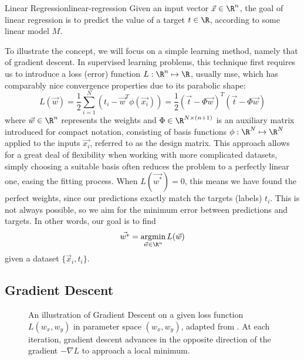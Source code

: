 \begin{definition}{Linear Regression}{linear-regression}
  Given an input vector $\vec{x} \in \R^n$, the goal of linear regression is to predict the value of a target $t \in \R$, according to some linear model $M$.
\end{definition}

To illustrate the concept, we will focus on a simple learning method, namely that of gradient descent.
In supervised learning problems, this technique first requires us to introduce a loss (error) function $L: \R^n \mapsto \R$, usually \gls{mse}, which has comparably nice convergence properties due to its parabolic shape:
$$L(\vec{w}) = \frac{1}{2} \sum_{i=1}^N (t_i - \vec{w}^T \phi(\vec{x_i})) = \frac{1}{2} (\vec{t} - \Phi \vec{w})^T (\vec{t} - \Phi \vec{w})$$
where $\vec{w} \in \R^n$ represents the weights and $\Phi \in \R^{N \times (n+1)}$ is an auxiliary matrix introduced for compact notation, consisting of basis functions $\phi: \R^N \mapsto \R^N$ applied to the inputs $\vec{x_i}$, referred to as the design matrix.
This approach allows for a great deal of flexibility when working with more complicated datasets, simply choosing a suitable basis often reduces the problem to a perfectly linear one, easing the fitting process.
When $L(\vec{w^*}) = 0$, this means we have found the perfect weights, since our predictions exactly match the targets (labels) $t_i$.
This is not always possible, so we aim for the minimum error between predictions and targets.
In other words, our goal is to find
$$\vec{w^*} = \underset{\vec{w} \in \R^n}{\text{argmin}}\, L(\vec{w})$$
given a dataset $\{\vec{x}_i, t_i\}$.

\subsection{Gradient Descent}
\begin{figure}[H]
  \centering
  \caption[Illustration of Gradient Descent]{
    An illustration of Gradient Descent on a given loss function $L(w_x, w_y)$ in parameter space $(w_x, w_y)$, adapted from \cite{gradient-descent-plot}.
    At each iteration, gradient descent advances in the opposite direction of the gradient $-\nabla L$ to approach a local minimum.
  }
  \label{fig:gradient-descent}
\end{figure}

